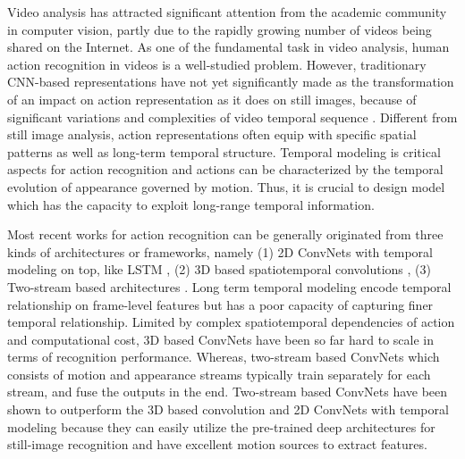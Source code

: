 \documentclass[conference,compsoc]{IEEEtran}
\begin{document}
Video analysis has attracted significant attention from the academic community in computer vision, partly due to the rapidly growing number of videos being shared on the Internet. As one of the fundamental task in video analysis, human action recognition in videos is a well-studied problem. However, traditionary CNN-based representations \cite{karpathy2014large} have not yet significantly made as the transformation of an impact on action representation as it does on still images, because of significant variations and complexities of video temporal sequence \cite{qiu2017learning}. Different from still image analysis, action representations often equip with specific spatial patterns as well as long-term temporal structure. Temporal modeling is critical aspects for action recognition and actions can be characterized by the temporal evolution of appearance governed by motion. Thus, it is crucial to design model which has the capacity to exploit long-range temporal information.

Most recent works for action recognition can be generally originated from three kinds of architectures or frameworks, namely (1) 2D ConvNets with temporal modeling on top, like LSTM \cite{donahue2015long}, (2) 3D based spatiotemporal convolutions \cite{tran2015learning} \cite{ji20133d}, (3) Two-stream based architectures \cite{simonyan2014two} \cite{feichtenhofer2016convolutional} \cite{wang2016temporal}. Long term temporal modeling encode temporal relationship on frame-level features but has a poor capacity of capturing finer temporal relationship. Limited by complex spatiotemporal dependencies of action and computational cost, 3D based ConvNets have been so far hard to scale in terms of recognition performance. Whereas, two-stream based ConvNets \cite{simonyan2014two} which consists of motion and appearance streams typically train separately for each stream, and fuse the outputs in the end. Two-stream based ConvNets have been shown to outperform the 3D based convolution and 2D ConvNets with temporal modeling because they can easily utilize the pre-trained deep architectures \cite{he2016deep} for still-image recognition and have excellent motion sources to extract features.
\end{document}
